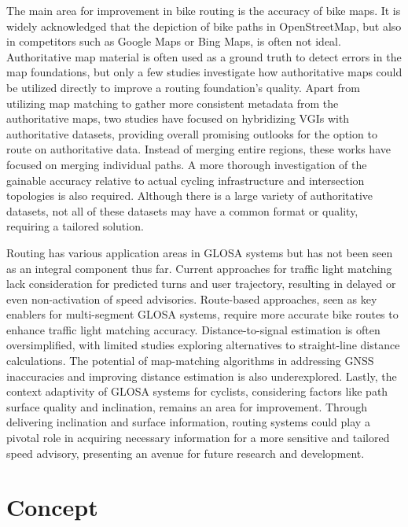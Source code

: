 \begin{Summary}
The main area for improvement in bike routing is the accuracy of bike maps. It is widely acknowledged that the depiction of bike paths in OpenStreetMap, but also in competitors such as Google Maps or Bing Maps, is often not ideal. Authoritative map material is often used as a ground truth to detect errors in the map foundations, but only a few studies investigate how authoritative maps could be utilized directly to improve a routing foundation's quality. Apart from utilizing map matching to gather more consistent metadata from the authoritative maps, two studies have focused on hybridizing VGIs with authoritative datasets, providing overall promising outlooks for the option to route on authoritative data. Instead of merging entire regions, these works have focused on merging individual paths. A more thorough investigation of the gainable accuracy relative to actual cycling infrastructure and intersection topologies is also required. Although there is a large variety of authoritative datasets, not all of these datasets may have a common format or quality, requiring a tailored solution.

Routing has various application areas in GLOSA systems but has not been seen as an integral component thus far. Current approaches for traffic light matching lack consideration for predicted turns and user trajectory, resulting in delayed or even non-activation of speed advisories. Route-based approaches, seen as key enablers for multi-segment GLOSA systems, require more accurate bike routes to enhance traffic light matching accuracy. Distance-to-signal estimation is often oversimplified, with limited studies exploring alternatives to straight-line distance calculations. The potential of map-matching algorithms in addressing GNSS inaccuracies and improving distance estimation is also underexplored. Lastly, the context adaptivity of GLOSA systems for cyclists, considering factors like path surface quality and inclination, remains an area for improvement. Through delivering inclination and surface information, routing systems could play a pivotal role in acquiring necessary information for a more sensitive and tailored speed advisory, presenting an avenue for future research and development.
\end{Summary}

\section{Concept}

